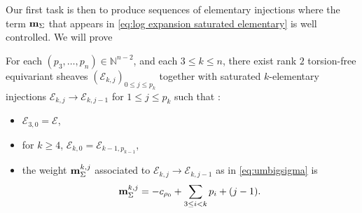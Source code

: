 \documentclass[a4paper,10pt]{amsart}
\theoremstyle{plain}{
    \newtheorem{theorem}{Theorem}[section]
    \newtheorem{lemma}[theorem]{Lemma}
    \newtheorem{corollary}[theorem]{Corollary}
    \newtheorem{proposition}[theorem]{Proposition}
    \newtheorem{conjecture}[theorem]{Conjecture}
}
\theoremstyle{definition}{
    \newtheorem{definition}[theorem]{Definition}
    \newtheorem{defn-thm}[theorem]{Definition-Theorem}
    \newtheorem{example}[theorem]{Example}
    \newtheorem{notation}[theorem]{Notation}
}
\theoremstyle{remark}{
    \newtheorem{remark}[theorem]{Remark}
    \newtheorem{problem}[theorem]{Problem}
    \newtheorem{question}[theorem]{Question}
}
\def\um{{\bf m}}
\def\cE{\mathcal{E}}
\def\N{\mathbb{N}}
\begin{document}
Our first task is then to produce sequences of elementary injections where the term $\um_\Sigma$ that appears in \eqref{eq:log expansion saturated elementary} is well controlled. We will prove
\begin{proposition}
 \label{prop:existence sequence saturated injections}
 For each $(p_3,\ldots,p_n)\in\N^{n-2}$, and each  $3\leq k \leq n$, 
 there exist rank $2$ torsion-free equivariant sheaves $(\cE_{k,j})_{0\leq j\leq p_k}$ together with saturated $k$-elementary injections $\cE_{k,j}\to\cE_{k,j-1}$ for $1\leq j\leq p_k$ such that :
 \begin{itemize}
  \item $\cE_{3,0}=\cE$, 
  \item for $k\geq 4$,  $\cE_{k,0}=\cE_{k-1,p_{k-1}}$, 
  \item the weight $\um_\Sigma^{k,j}$ associated to  $\cE_{k,j}\to\cE_{k,j-1}$ as in \eqref{eq:umbigsigma} is 
 \begin{equation}
  \label{eq:umsigmakj}
 \um_\Sigma^{k,j}=-c_{\rho_0}+\sum_{3\leq i < k}p_i+(j-1).
 \end{equation}

 \end{itemize}
\end{proposition}
\end{document}
